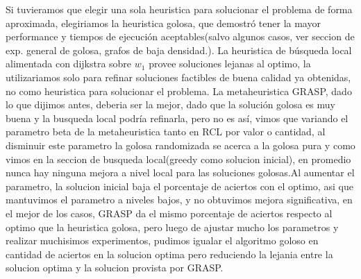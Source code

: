 Si tuvieramos que elegir una sola heuristica para solucionar el problema de forma aproximada, elegiriamos la heuristica golosa, que demostr\'o tener la mayor performance y tiempos de ejecuci\'on aceptables(salvo algunos casos, ver seccion de exp. general de golosa, grafos de baja densidad.). La heuristica de b\'usqueda local alimentada con dijkstra sobre $w_1$ provee soluciones lejanas al optimo, la utilizariamos solo para refinar soluciones factibles de buena calidad ya obtenidas, no como heuristica para solucionar el problema. La metaheuristica GRASP, dado lo que dijimos antes, deberia ser la mejor, dado que la soluci\'on golosa es muy buena y la busqueda local podr\'ia refinarla, pero no es as\'i, vimos que variando el parametro beta de la metaheuristica tanto en RCL por valor o cantidad, al disminuir este parametro la golosa randomizada se acerca a la golosa pura y como vimos en la seccion de busqueda local(greedy como solucion inicial), en promedio nunca hay ninguna mejora a nivel local para las soluciones golosas.Al aumentar el parametro, la solucion inicial baja el porcentaje de aciertos con el optimo, asi que mantuvimos el parametro a niveles bajos, y no obtuvimos mejora significativa, en el mejor de los casos, GRASP da el mismo porcentaje de aciertos respecto al optimo que la heuristica golosa, pero luego de ajustar mucho los parametros y realizar muchisimos experimentos, pudimos igualar el algoritmo goloso en cantidad de aciertos en la solucion optima pero reduciendo la lejania entre la solucion optima y la solucion provista por GRASP.